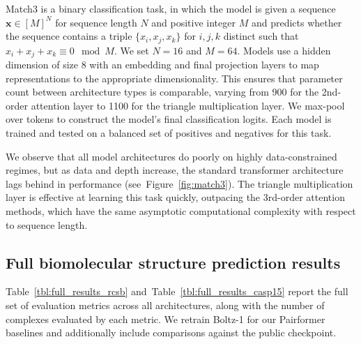\documentclass{article} %
\newcommand{\reffig}[1]{Figure~\ref{fig:#1}}
\newcommand{\reftbl}[1]{Table~\ref{tbl:#1}}
\begin{document}
Match3 is a binary classification task, in which the model is given a sequence $\mathbf{x}\in [M]^N$ for sequence length $N$ and positive integer $M$ and predicts whether the sequence contains a triple $\{x_i, x_j, x_k\}$ for $i,j,k$ distinct such that $x_i+x_j+x_k\equiv 0 \mod M$. We set $N=16$ and $M=64$. Models use a hidden dimension of size $8$ with an embedding and final projection layers to map representations to the appropriate dimensionality. This ensures that parameter count between architecture types is comparable, varying from 900 for the 2nd-order attention layer to 1100 for the triangle multiplication layer. We max-pool over tokens to construct the model's final classification logits. Each model is trained and tested on a balanced set of positives and negatives for this task.

We observe that all model architectures do poorly on highly data-constrained regimes, but as data and depth increase, the standard transformer architecture lags behind in performance (see~\reffig{match3}). The triangle multiplication layer is effective at learning this task quickly, outpacing the 3rd-order attention methods, which have the same asymptotic computational complexity with respect to sequence length.



\subsection{Full biomolecular structure prediction results}
\reftbl{full_results_rcsb} and~\reftbl{full_results_casp15} report the full set of evaluation metrics across all architectures, along with the number of complexes evaluated by each metric.
We retrain Boltz-1 for our Pairformer baselines and additionally include comparisons against the public checkpoint.
\end{document}
